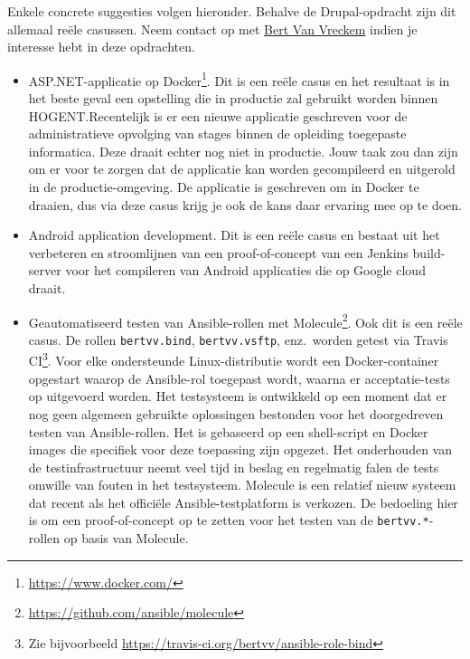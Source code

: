 Enkele concrete suggesties volgen hieronder. Behalve de Drupal-opdracht zijn dit allemaal reële casussen. Neem contact op met \href{mailto:bert.vanvreckem@hogent.be}{Bert Van Vreckem} indien je interesse hebt in deze opdrachten.

\begin{itemize}
  \item ASP.NET-applicatie op Docker\footnote{\url{https://www.docker.com/}}. Dit is een reële casus en het resultaat is in het beste geval een opstelling die in productie zal gebruikt worden binnen HOGENT.\@ Recentelijk is er een nieuwe applicatie geschreven voor de administratieve opvolging van stages binnen de opleiding toegepaste informatica. Deze draait echter nog niet in productie. Jouw taak zou dan zijn om er voor te zorgen dat de applicatie kan worden gecompileerd en uitgerold in de productie-omgeving. De applicatie is geschreven om in Docker te draaien, dus via deze casus krijg je ook de kans daar ervaring mee op te doen. 
  
  \item Android application development. Dit is een reële casus en bestaat uit het verbeteren en stroomlijnen van een proof-of-concept van een Jenkins build-server voor het compileren van Android applicaties die op Google cloud draait.
  
  \item Geautomatiseerd testen van Ansible-rollen met Molecule\footnote{\url{https://github.com/ansible/molecule}}. Ook dit is een reële casus. De rollen \texttt{bertvv.bind}, \texttt{bertvv.vsftp}, enz.\ worden getest via Travis CI\footnote{Zie bijvoorbeeld \url{https://travis-ci.org/bertvv/ansible-role-bind}}. Voor elke ondersteunde Linux-distributie wordt een Docker-container opgestart waarop de Ansible-rol toegepast wordt, waarna er acceptatie-tests op uitgevoerd worden. Het testsysteem is ontwikkeld op een moment dat er nog geen algemeen gebruikte oplossingen bestonden voor het doorgedreven testen van Ansible-rollen. Het is gebaseerd op een shell-script en Docker images die specifiek voor deze toepassing zijn opgezet. Het onderhouden van de testinfrastructuur neemt veel tijd in beslag en regelmatig falen de tests omwille van fouten in het testsysteem. Molecule is een relatief nieuw systeem dat recent als het officiële Ansible-testplatform is verkozen. De bedoeling hier is om een proof-of-concept op te zetten voor het testen van de \texttt{bertvv.*}-rollen op basis van Molecule.
  

\end{itemize}
